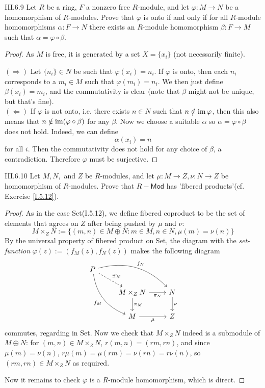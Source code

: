 \begin{problem}{III.6.9}
Let $R$ be a ring, $F$ a nonzero free $R$-module, and let $\varphi: M \to N$ be a homomorphism of $R$-modules. Prove that $\varphi$ is onto if and only if for all $R$-module homomorphisms $\alpha: F \to N$ there exists an $R$-module homomorphism $\beta:F \to M$ such that $\alpha = \varphi \circ \beta$.
\end{problem}
\begin{proof}
As $M$ is free, it is generated by a set $X = \{x_i\}$ (not necessarily finite).

\noindent $(\Rightarrow)$ Let $\{n_i\} \in N$ be such that $\varphi(x_i) = n_i$. If $\varphi$ is onto, then each $n_i$ corresponds to a $m_i \in M$ such that $\varphi(m_i) = n_i$. We then just define $\beta(x_i) = m_i$, and the commutativity is clear (note that $\beta$ might not be unique, but that's fine). \\
$(\Leftarrow)$ If $\varphi$ is not onto, i.e. there exists $n \in N$ such that $n \notin \operatorname{im} \varphi$, then this also means that $n \notin \operatorname{im} (\varphi \circ \beta)$ for any $\beta$. Now we choose a suitable $\alpha$ so $\alpha = \varphi \circ \beta$ does not hold. Indeed, we can define
\[
\alpha(x_i) = n
\]
for all $i$. Then the commutativity does not hold for any choice of $\beta$, a contradiction. Therefore $\varphi$ must be surjective.
\end{proof}


\begin{problem}{III.6.10}
Let $M,N,$ and $Z$ be $R$-modules, and let $\mu:M \to Z, \nu:N \to Z$ be homomorphism of $R$-modules. Prove that $R-\mathsf{Mod}$ has 'fibered products'(cf. Exercise \ref{I.5.12}).
\end{problem}
\begin{proof}
As in the case \textsf{Set}(I.5.12), we define fibered coproduct to be  the set of elements that agrees on $Z$ after being pushed by $\mu$ and $\nu$:
\[
M \times_Z N := \{(m,n)\in M \oplus N:m\in M, n \in N, \mu(m) = \nu(n)\}
\]
By the universal property of fibered product on \textsf{Set}, the diagram with the \emph{set-function} $\varphi(z) := (f_M(z),f_N(z))$ makes the following diagram
\[
\begin{tikzcd}
P \arrow[rd, "\exists!\varphi", dashed] \arrow[rdd, "f_M"', bend right] \arrow[rrd, "f_N", bend left] & & \\
& M \times_Z N \arrow[d, "\pi_M"] \arrow[r, "\pi_N"'] & N \arrow[d, "\nu"] \\
& M \arrow[r, "\mu"']  & Z
\end{tikzcd}
\]
commutes, regarding in \textsf{Set}. Now we check that $M \times_Z N$ indeed is a submodule of $M \oplus N$: for $(m,n) \in M \times_Z N$, $r (m,n) = (rm,rn)$, and since $\mu(m)=\nu(n)$, $r\mu(m) = \mu(rm) = \nu(rn) = r\nu(n)$, so $(rm,rn) \in M \times_Z N$ as required.

Now it remains to check $\varphi$ is a $R$-module homomorphism, which is direct.
\end{proof}

